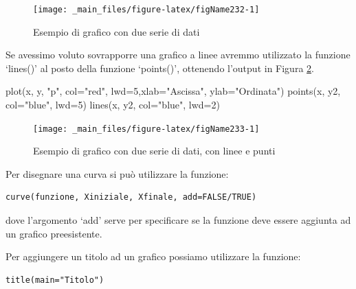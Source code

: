 \documentclass[a4paper,12pt,oneside]{book}
\newenvironment{Shaded}{}{}
\newcommand{\KeywordTok}[1]{#1}
\newcommand{\DataTypeTok}[1]{#1}
\newcommand{\DecValTok}[1]{#1}
\newcommand{\StringTok}[1]{#1}
\newcommand{\NormalTok}[1]{#1}
\begin{document}
\begin{figure}

{\centering \texttt{[image: \_main\_files/figure-latex/figName232-1]} 

}

\caption{Esempio di grafico con due serie di dati}\label{fig:figName232}
\end{figure}

Se avessimo voluto sovrapporre una grafico a linee avremmo utilizzato la funzione `lines()' al posto della funzione `points()', ottenendo l'output in Figura \ref{fig:figName233}.

\begin{Shaded}
\begin{Highlighting}[]
\KeywordTok{plot}\NormalTok{(x, y, }\StringTok{"p"}\NormalTok{, }\DataTypeTok{col=}\StringTok{"red"}\NormalTok{, }\DataTypeTok{lwd=}\DecValTok{5}\NormalTok{,}\DataTypeTok{xlab=}\StringTok{"Ascissa"}\NormalTok{, }\DataTypeTok{ylab=}\StringTok{"Ordinata"}\NormalTok{)}
\KeywordTok{points}\NormalTok{(x, y2, }\DataTypeTok{col=}\StringTok{"blue"}\NormalTok{, }\DataTypeTok{lwd=}\DecValTok{5}\NormalTok{)}
\KeywordTok{lines}\NormalTok{(x, y2, }\DataTypeTok{col=}\StringTok{"blue"}\NormalTok{, }\DataTypeTok{lwd=}\DecValTok{2}\NormalTok{)}
\end{Highlighting}
\end{Shaded}

\begin{figure}

{\centering \texttt{[image: \_main\_files/figure-latex/figName233-1]} 

}

\caption{Esempio di grafico con due serie di dati, con linee e punti}\label{fig:figName233}
\end{figure}

Per disegnare una curva si può utilizzare la funzione:

\begin{verbatim}
curve(funzione, Xiniziale, Xfinale, add=FALSE/TRUE)
\end{verbatim}

dove l'argomento `add' serve per specificare se la funzione deve essere aggiunta ad un grafico preesistente.

Per aggiungere un titolo ad un grafico possiamo utilizzare la funzione:

\begin{verbatim}
title(main="Titolo")
\end{verbatim}
\end{document}

